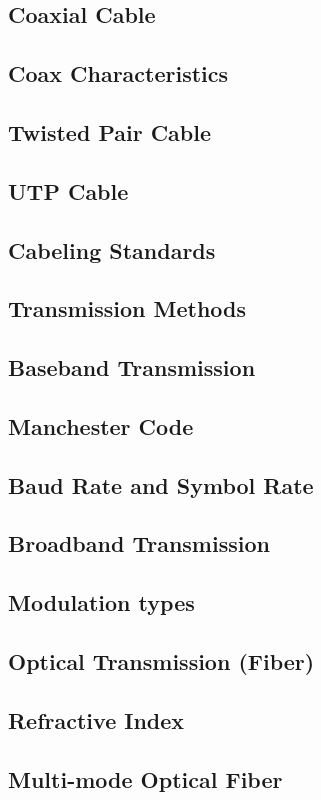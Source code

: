 \documentclass[11pt]{article}
\begin{document}
\subsection{Coaxial Cable}
\subsection{Coax Characteristics}
\subsection{Twisted Pair Cable}
\subsection{UTP Cable}
\subsection{Cabeling Standards}
\subsection{Transmission Methods}
\subsection{Baseband Transmission}
\subsection{Manchester Code}
\subsection{Baud Rate and Symbol Rate}
\subsection{Broadband Transmission}
\subsection{Modulation types}
\subsection{Optical Transmission (Fiber)}
\subsection{Refractive Index}
\subsection{Multi-mode Optical Fiber}
\end{document}
